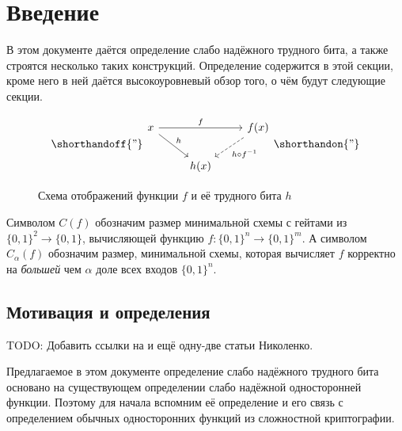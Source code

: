 \documentclass[oneside, a4paper]{article}
\theoremstyle{definition}
\theoremstyle{remark}
\begin{document}
\title{}
\author{Олейников Иван}
\date{\today}
\maketitle

\tableofcontents

\section{Введение}

В этом документе даётся определение слабо надёжного трудного бита, а также
строятся несколько таких конструкций. Определение содержится в этой секции,
кроме него в ней даётся высокоуровневый обзор того, о чём будут следующие
секции.

\begin{figure}[h]
\[
\shorthandoff{"}
\begin{tikzcd}
x \arrow[rr, "f"] \arrow[rd, "h"] & ~ & f(x) \arrow[ld, dashrightarrow, "h \circ f^{-1}"] \\
~ & h(x) & ~
\end{tikzcd}
\shorthandon{"}
\]
\caption{Схема отображений функции $f$ и её трудного бита $h$}
\end{figure}


Символом $C(f)$ обозначим размер минимальной схемы с гейтами из $\{0, 1\}^2 \to
\{0, 1\}$, вычисляющей функцию $f : \{0, 1\}^n \to \{0, 1\}^m$. А символом
$C_\alpha(f)$ обозначим размер, минимальной схемы, которая вычисляет $f$
корректно на \emph{большей} чем $\alpha$ доле всех входов $\{0, 1\}^n$.

\subsection{Мотивация и определения}

TODO: Добавить ссылки на \cite{hirsch_milanich_nikolenko} и ещё одну-две статьи
Николенко.

Предлагаемое в этом документе определение слабо надёжного трудного бита основано
на существующем определении слабо надёжной односторонней функции. Поэтому для
начала вспомним её определение и его связь с определением обычных односторонних
функций из сложностной криптографии.
\end{document}
